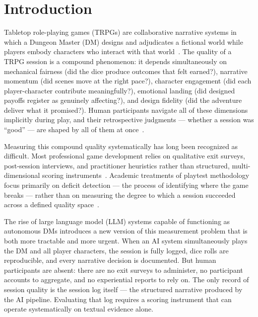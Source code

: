 
\section{Introduction}
\label{sec:introduction}

Tabletop role-playing games (TRPGs) are collaborative narrative systems in which a
Dungeon Master (DM) designs and adjudicates a fictional world while players embody
characters who interact with that world~\cite{dungeons2014players}. The quality of a
TRPG session is a compound phenomenon: it depends simultaneously on mechanical
fairness (did the dice produce outcomes that felt earned?), narrative momentum (did
scenes move at the right pace?), character engagement (did each player-character
contribute meaningfully?), emotional landing (did designed payoffs register as
genuinely affecting?), and design fidelity (did the adventure deliver what it
promised?). Human participants navigate all of these dimensions implicitly during
play, and their retrospective judgments --- whether a session was ``good'' --- are
shaped by all of them at once~\cite{bowman2010functions}.

Measuring this compound quality systematically has long been recognized as difficult.
Most professional game development relies on qualitative exit surveys, post-session
interviews, and practitioner heuristics rather than structured, multi-dimensional
scoring instruments~\cite{playtesting2019, fullerton2008}. Academic treatments of
playtest methodology focus primarily on deficit detection --- the process of
identifying where the game breaks --- rather than on measuring the degree to which a
session succeeded across a defined quality space~\cite{zagal2008collaborative}.

The rise of large language model (LLM) systems capable of functioning as autonomous
DMs introduces a new version of this measurement problem that is both more tractable
and more urgent. When an AI system simultaneously plays the DM and all player
characters, the session is fully logged, dice rolls are reproducible, and every
narrative decision is documented. But human participants are absent: there are no
exit surveys to administer, no participant accounts to aggregate, and no experiential
reports to rely on. The only record of session quality is the session log itself ---
the structured narrative produced by the AI pipeline. Evaluating that log requires a
scoring instrument that can operate systematically on textual evidence alone.

